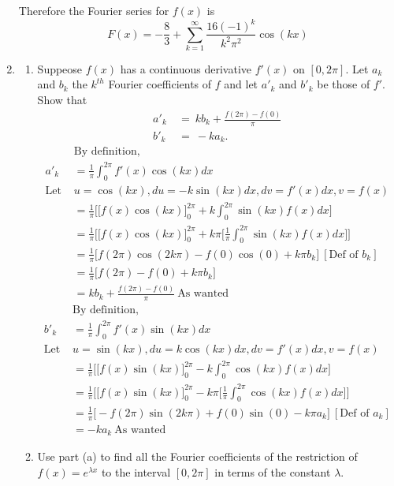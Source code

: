 \documentclass{article}
\begin{document}
\begin{enumerate}
    Therefore the Fourier series for $f(x)$ is 
        \[
        F(x) = - \frac{8}{3} + \sum_{k=1}^{\infty} \frac{16(-1)^k}{k^2\pi^2}\cos(kx)
        \]
    \newpage
    \item
    \begin{enumerate}
        \item Suppeose $f(x)$ has a continuous derivative $f'(x)$ on $[0,2\pi]$. Let $a_k$ and $b_k$ the $k^{th}$ Fourier coefficients of $f$ and let $a'_k$ and $b'_k$ be those of $f'$. Show that
        \begin{align*}
            a'_k \: &= \: kb_k + \frac{f(2\pi)-f(0)}{\pi} \\
            b'_k \: &= \: -ka_k.
        \end{align*}
        \begin{align*}
            &\text{By definition, } \\
            a'_k &= \frac{1}{\pi}\int_{0}^{2\pi}f'(x)\cos(kx)dx\\
            \text{Let }&u = \cos(kx), du = -k\sin(kx)dx, dv = f'(x)dx , v = f(x) \\
            &= \frac{1}{\pi}\Bigg[\Big[f(x)\cos(kx)\Big]^{2\pi}_{0} + k\int_{0}^{2\pi}\sin(kx)f(x)dx\Bigg] \\
            &= \frac{1}{\pi} \Bigg[ \Big[ f(x)\cos(kx) \Big]^{2\pi}_{0}  + k\pi \Big[\frac{1}{\pi}\int_{0}^{2\pi}\sin(kx)f(x)dx\Big]\Bigg] \\            
            &= \frac{1}{\pi} \Bigg[ f(2\pi)\cos(2k\pi) - f(0)\cos(0) + k\pi b_k\Bigg] \: [\text{Def of $b_k$}] \\
            &= \frac{1}{\pi} \Bigg[ f(2\pi) - f(0) + k\pi b_k\Bigg] \\
            &= kb_k + \frac{f(2\pi) - f(0)}{\pi} \: \text{As wanted}
        \end{align*}
        \begin{align*}
            &\text{By definition, } \\
            b'_k &= \frac{1}{\pi}\int_{0}^{2\pi}f'(x)\sin(kx)dx\\
            \text{Let }&u = \sin(kx), du = k\cos(kx)dx, dv = f'(x)dx , v = f(x) \\
            &= \frac{1}{\pi}\Bigg[\Big[f(x)\sin(kx)\Big]^{2\pi}_{0} - k\int_{0}^{2\pi}\cos(kx)f(x)dx\Bigg] \\
            &= \frac{1}{\pi} \Bigg[ \Big[ f(x)\sin(kx) \Big]^{2\pi}_{0}  - k\pi \Big[\frac{1}{\pi}\int_{0}^{2\pi}\cos(kx)f(x)dx\Big]\Bigg] \\            
            &= \frac{1}{\pi} \Bigg[ -f(2\pi)\sin(2k\pi) + f(0)\sin(0) - k\pi a_k\Bigg] \: [\text{Def of $a_k$}] \\
            &= -ka_k \: \text{As wanted}
        \end{align*}
        \newpage
        \item Use part (a) to find all the Fourier coefficients of the restriction of $f(x) = e^{\lambda x}$ to the interval $[0,2\pi]$ in terms of the constant $\lambda$.

\end{enumerate}
\end{enumerate}
\end{document}
